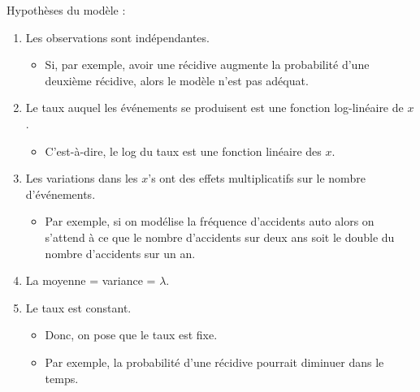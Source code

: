\documentclass[french]{article}
\begin{document}
\begin{multicols*}{2}
Hypothèses du modèle :
\begin{enumerate}
	\item	Les observations sont indépendantes.
		\begin{itemize}
		\item	Si, par exemple, avoir une récidive augmente la probabilité d'une deuxième récidive, alors le modèle n'est pas adéquat.
		\end{itemize}
	\item	Le taux auquel les événements se produisent est une fonction log-linéaire de $x$.
		\begin{itemize}
		\item	C'est-à-dire, le log du taux est une fonction linéaire des $x$.
		\end{itemize}
	\item	Les variations dans les $x$'s ont des effets multiplicatifs sur le nombre d'événements.
		\begin{itemize}
		\item	Par exemple, si on modélise la fréquence d'accidents auto alors on s'attend à ce que le nombre d'accidents sur deux ans soit le double du nombre d'accidents sur un an.
		\end{itemize}
	\item	La moyenne = variance = $\lambda$.
	\item	Le taux est constant.
		\begin{itemize}
		\item	Donc, on pose que le taux est fixe.
		\item	Par exemple, la probabilité d'une récidive pourrait diminuer dans le temps.
		\end{itemize}
\end{enumerate}


\end{multicols*}
\end{document}
